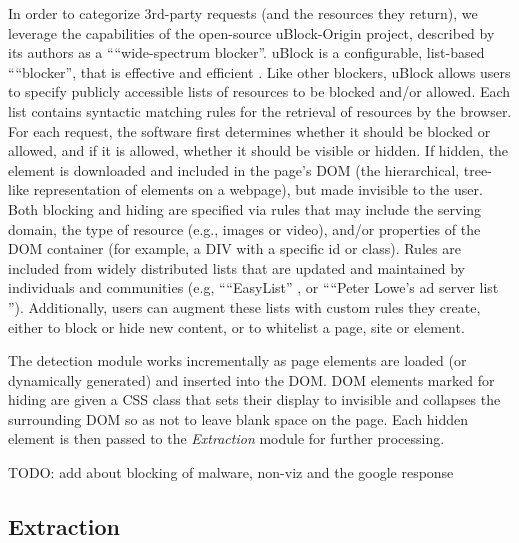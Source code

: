 \documentclass[conference]{IEEEtran}
\begin{document}
In order to categorize 3rd-party requests (and the resources they return), we leverage the capabilities of the open-source uBlock-Origin \cite{Gorhill} project, described by its authors as a ““wide-spectrum blocker”. uBlock is a configurable, list-based ““blocker”, that is effective and efficient \cite{Wills}. Like other blockers, uBlock allows users to specify publicly accessible lists of resources to be blocked and/or allowed. Each list contains syntactic matching rules for the retrieval of resources by the browser. For each request, the software first determines whether it should be blocked or allowed, and if it is allowed, whether it should be visible or hidden. If hidden, the element is downloaded and included in the page's DOM (the hierarchical, tree-like representation of elements on a webpage), but made invisible to the user. Both blocking and hiding are specified via rules that may include the serving domain, the type of resource (e.g., images or video), and/or properties of the DOM container (for example, a DIV with a specific id or class). Rules are included from widely distributed lists that are updated and maintained by individuals and communities (e.g, ““EasyList” \cite{EasyList}, or ““Peter Lowe's ad server list \cite{Lowe}”). Additionally, users can augment these lists with custom rules they create, either to block or hide new content, or to whitelist a page, site or element.

The detection module works incrementally as page elements are loaded (or dynamically generated) and inserted into the DOM. DOM elements marked for hiding are given a CSS class that sets their display to invisible and collapses the surrounding DOM so as not to leave blank space on the page. Each hidden element is then passed to the \emph{Extraction} module for further processing.

TODO: add about blocking of malware, non-viz and the google response

\subsection{Extraction}
\end{document}
